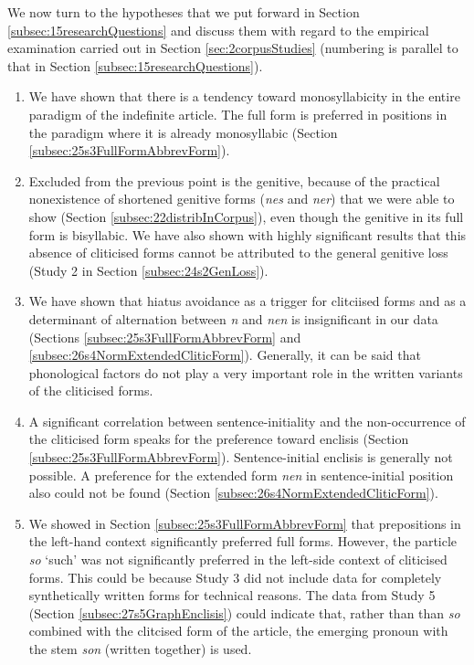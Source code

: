 We now turn to the hypotheses that we put forward in Section \ref{subsec:15researchQuestions} and discuss them with regard to the empirical examination carried out in Section \ref{sec:2corpusStudies} (numbering is parallel to that in Section \ref{subsec:15researchQuestions}).

\begin{enumerate}
	\item We have shown that there is a tendency toward monosyllabicity in the entire paradigm of the indefinite article. 
	The full form is preferred in positions in the paradigm where it is already monosyllabic (Section \ref{subsec:25s3FullFormAbbrevForm}).
	\item Excluded from the previous point is the genitive, because of the practical nonexistence of shortened genitive forms (\textit{nes} and \textit{ner}) that we were able to show (Section \ref{subsec:22distribInCorpus}), even though the genitive in its full form is bisyllabic.
	We have also shown with highly significant results that this absence of cliticised forms cannot be attributed to the general genitive loss (Study 2 in Section \ref{subsec:24s2GenLoss}).
	\item We have shown that hiatus avoidance as a trigger for clitciised forms and as a determinant of alternation between \textit{n} and \textit{nen} is insignificant in our data (Sections \ref{subsec:25s3FullFormAbbrevForm} and \ref{subsec:26s4NormExtendedCliticForm}).
	Generally, it can be said that phonological factors do not play a very important role in the written variants of the cliticised forms.
	\item A significant correlation between sentence-initiality and the non-occurrence of the cliticised form speaks for the preference toward enclisis (Section \ref{subsec:25s3FullFormAbbrevForm}).
	Sentence-initial enclisis is generally not possible.
	A preference for the extended form \textit{nen} in sentence-initial position also could not be found (Section \ref{subsec:26s4NormExtendedCliticForm}).
	\item We showed in Section \ref{subsec:25s3FullFormAbbrevForm} that prepositions in the left-hand context significantly preferred full forms.
	However, the particle \textit{so} `such' was not significantly preferred in the left-side context of cliticised forms.
	This could be because Study 3 did not include data for completely synthetically written forms for technical reasons.
	The data from Study 5 (Section \ref{subsec:27s5GraphEnclisis}) could indicate that, rather than than \textit{so} combined with the clitcised form of the article, the emerging pronoun with the stem \textit{son} (written together) is used.

\end{enumerate}
